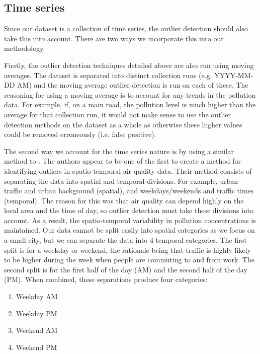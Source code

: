 \documentclass[11pt]{report}
\begin{document}
\subsection{Time series} \label{time_series_incorp}

Since our dataset is a collection of time series, the outlier detection should also take this into account. There are two ways we incorporate this into our methodology.

Firstly, the outlier detection techniques detailed above are also run using moving averages. The dataset is separated into distinct collection runs (e.g. YYYY-MM-DD AM) and the moving average outlier detection is run on each of these. The reasoning for using a moving average is to account for any trends in the pollution data. For example, if, on a main road, the pollution level is much higher than the average for that collection run, it would not make sense to use the outlier detection methods on the dataset as a whole as otherwise these higher values could be removed erroneously (i.e. false positive).

The second way we account for the time series nature is by using a similar method to \cite{vanZoest2018outlierdetection}. The authors appear to be one of the first to create a method for identifying outliers in spatio-temporal air quality data. Their method consists of separating the data into spatial and temporal divisions. For example, urban traffic and urban background (spatial), and weekdays/weekends and traffic times (temporal). The reason for this was that air quality can depend highly on the local area and the time of day, so outlier detection must take these divisions into account. As a result, the spatio-temporal variability in pollution concentrations is maintained. Our data cannot be split easily into spatial categories as we focus on a small city, but we can separate the data into 4 temporal categories. The first split is for a weekday or weekend, the rationale being that traffic is highly likely to be higher during the week when people are commuting to and from work. The second split is for the first half of the day (AM) and the second half of the day (PM). When combined, these separations produce four categories:
\begin{enumerate}
\item Weekday AM
\item Weekday PM
\item Weekend AM
\item Weekend PM
\end{enumerate}
\end{document}
